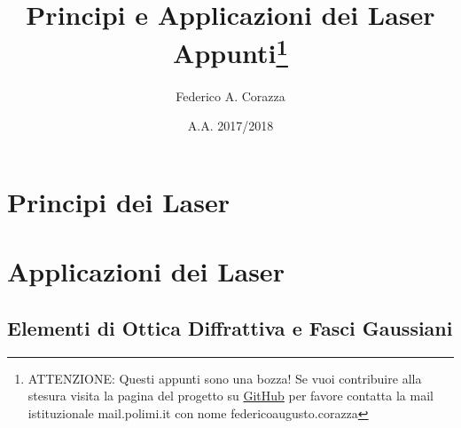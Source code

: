 \documentclass{book}
\title{Principi e Applicazioni dei Laser\\ Appunti\thanks{ATTENZIONE: Questi appunti sono una bozza! Se vuoi contribuire alla stesura visita la pagina del progetto su \href{https://github.com/Imperator26/}{GitHub} per favore contatta la mail istituzionale mail.polimi.it con nome federicoaugusto.corazza}}
\date{A.A. 2017/2018}
\author{Federico A. Corazza}
\theoremstyle{remark}
\begin{document}
\maketitle
\tableofcontents
\cleardoublepage

\part{Principi dei Laser}






\part{Applicazioni dei Laser}

\chapter{Elementi di Ottica Diffrattiva e Fasci Gaussiani}
\end{document}
